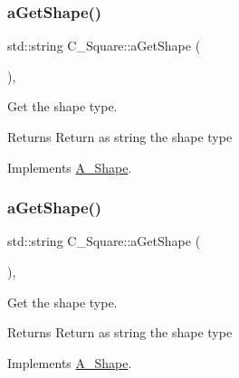\mbox{\label{classC__Square_a4919017d3750c1b8deb5f07d22069636}} 
\subsubsection{\texorpdfstring{a\+Get\+Shape()}{aGetShape()}\hspace{0.1cm}{\footnotesize\ttfamily [1/2]}}
{\footnotesize\ttfamily std\+::string C\+\_\+\+Square\+::a\+Get\+Shape (\begin{DoxyParamCaption}{ }\end{DoxyParamCaption})\hspace{0.3cm}{\ttfamily [override]}, {\ttfamily [virtual]}}



Get the shape type. 

\begin{DoxyReturn}{Returns}
Return as string the shape type 
\end{DoxyReturn}


Implements \hyperlink{classA__Shape_a1b202256a4e5dcb0edab4ab93a37122c}{A\+\_\+\+Shape}.

\mbox{\label{classC__Square_a4919017d3750c1b8deb5f07d22069636}} 
\subsubsection{\texorpdfstring{a\+Get\+Shape()}{aGetShape()}\hspace{0.1cm}{\footnotesize\ttfamily [2/2]}}
{\footnotesize\ttfamily std\+::string C\+\_\+\+Square\+::a\+Get\+Shape (\begin{DoxyParamCaption}{ }\end{DoxyParamCaption})\hspace{0.3cm}{\ttfamily [override]}, {\ttfamily [virtual]}}



Get the shape type. 

\begin{DoxyReturn}{Returns}
Return as string the shape type 
\end{DoxyReturn}


Implements \hyperlink{classA__Shape_a1b202256a4e5dcb0edab4ab93a37122c}{A\+\_\+\+Shape}.

